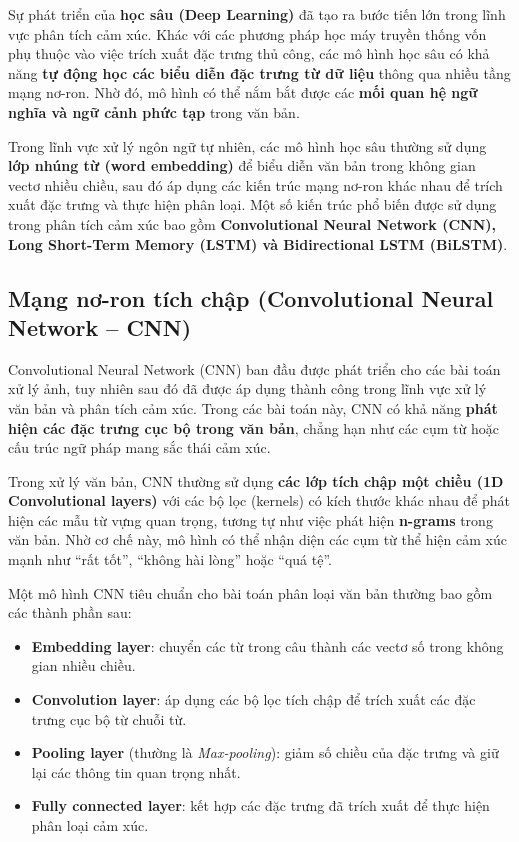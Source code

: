 \documentclass[14pt, a4paper]{report}
\begin{document}
Sự phát triển của \textbf{học sâu (Deep Learning)} đã tạo ra bước tiến lớn trong lĩnh vực phân tích cảm xúc. Khác với các phương pháp học máy truyền thống vốn phụ thuộc vào việc trích xuất đặc trưng thủ công, các mô hình học sâu có khả năng \textbf{tự động học các biểu diễn đặc trưng từ dữ liệu} thông qua nhiều tầng mạng nơ-ron. Nhờ đó, mô hình có thể nắm bắt được các \textbf{mối quan hệ ngữ nghĩa và ngữ cảnh phức tạp} trong văn bản.

Trong lĩnh vực xử lý ngôn ngữ tự nhiên, các mô hình học sâu thường sử dụng \textbf{lớp nhúng từ (word embedding)} để biểu diễn văn bản trong không gian vectơ nhiều chiều, sau đó áp dụng các kiến trúc mạng nơ-ron khác nhau để trích xuất đặc trưng và thực hiện phân loại. Một số kiến trúc phổ biến được sử dụng trong phân tích cảm xúc bao gồm \textbf{Convolutional Neural Network (CNN), Long Short-Term Memory (LSTM) và Bidirectional LSTM (BiLSTM)}.

\subsection{Mạng nơ-ron tích chập (Convolutional Neural Network -- CNN)}

Convolutional Neural Network (CNN) ban đầu được phát triển cho các bài toán xử lý ảnh, tuy nhiên sau đó đã được áp dụng thành công trong lĩnh vực xử lý văn bản và phân tích cảm xúc. Trong các bài toán này, CNN có khả năng \textbf{phát hiện các đặc trưng cục bộ trong văn bản}, chẳng hạn như các cụm từ hoặc cấu trúc ngữ pháp mang sắc thái cảm xúc.

Trong xử lý văn bản, CNN thường sử dụng \textbf{các lớp tích chập một chiều (1D Convolutional layers)} với các bộ lọc (kernels) có kích thước khác nhau để phát hiện các mẫu từ vựng quan trọng, tương tự như việc phát hiện \textbf{n-grams} trong văn bản. Nhờ cơ chế này, mô hình có thể nhận diện các cụm từ thể hiện cảm xúc mạnh như ``rất tốt'', ``không hài lòng'' hoặc ``quá tệ''.

Một mô hình CNN tiêu chuẩn cho bài toán phân loại văn bản thường bao gồm các thành phần sau:

\begin{itemize}
    \item \textbf{Embedding layer}: chuyển các từ trong câu thành các vectơ số trong không gian nhiều chiều.
    \item \textbf{Convolution layer}: áp dụng các bộ lọc tích chập để trích xuất các đặc trưng cục bộ từ chuỗi từ.
    \item \textbf{Pooling layer} (thường là \textit{Max-pooling}): giảm số chiều của đặc trưng và giữ lại các thông tin quan trọng nhất.
    \item \textbf{Fully connected layer}: kết hợp các đặc trưng đã trích xuất để thực hiện phân loại cảm xúc.
\end{itemize}
\end{document}
